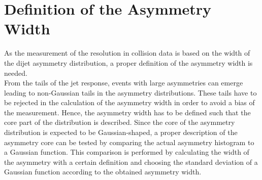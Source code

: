 \section{Definition of the Asymmetry Width}
\label{sec:jer_asymm_width_def}
As the measurement of the resolution in collision data is based on the width of the dijet asymmetry distribution, a proper definition of the asymmetry width is needed.\\
From the tails of the jet response, events with large asymmetries can emerge leading to non-Gaussian tails in the asymmetry distributions. These tails have to be rejected in the calculation of the asymmetry width in order to avoid a bias of the measurement. Hence, the asymmetry width has to be defined such that the core part of the distribution is described. Since the core of the asymmetry distribution is expected to be Gaussian-shaped, a proper description of the asymmetry core can be tested by comparing the actual asymmetry histogram to a Gaussian function. This comparison is performed by calculating the width of the asymmetry with a certain definition and choosing the standard deviation of a Gaussian function according to the obtained asymmetry width.  
